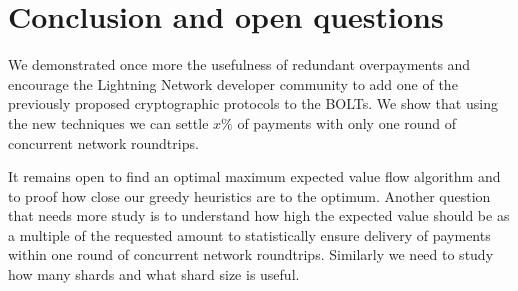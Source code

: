 \documentclass[10pt,twocolumn]{article}
\begin{document}
\section{Conclusion and open questions}
We demonstrated once more the usefulness of redundant overpayments and encourage the Lightning Network developer community to add one of the previously proposed cryptographic protocols to the BOLTs.
We show that using the new techniques we can settle $x\%$ of payments with only one round of concurrent network roundtrips.

It remains open to find an optimal maximum expected value flow algorithm and to proof how close our greedy heuristics are to the optimum.
Another question that needs more study is to understand how high the expected value should be as a multiple of the requested amount to statistically ensure delivery of payments within one round of concurrent network roundtrips.
Similarly we need to study how many shards and what shard size is useful.



\end{document}
